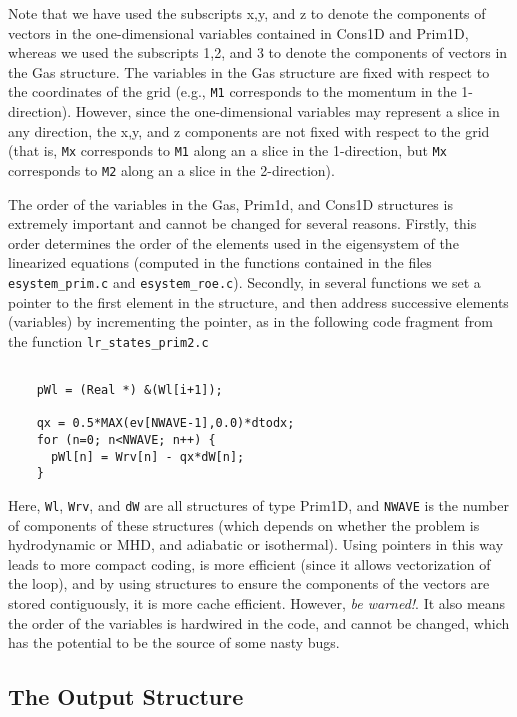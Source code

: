 Note that we have used the subscripts x,y, and z to denote the components
of vectors in the one-dimensional variables contained in Cons1D and
Prim1D, whereas we used the subscripts 1,2, and 3 to denote the components
of vectors in the Gas structure.  The variables in the Gas structure
are fixed with respect to the coordinates of the grid (e.g., {\tt M1}
corresponds to the momentum in the 1-direction).  However, since the
one-dimensional variables may represent a slice in any direction, the
x,y, and z components are not fixed with respect to the grid (that is,
{\tt Mx} corresponds to {\tt M1} along an a slice in the 1-direction,
but {\tt Mx} corresponds to {\tt M2} along an a slice in the 2-direction).

The order of the variables in the Gas, Prim1d, and Cons1D structures is
extremely important and
cannot be changed for several reasons.  Firstly, this order determines the
order of the elements used in the eigensystem of the linearized equations
(computed in the functions contained in the files {\tt esystem\_prim.c}
and {\tt esystem\_roe.c}).  Secondly, in several functions we set a
pointer to the first element in the structure, and then address successive
elements (variables) by incrementing the pointer, as in the
following code fragment from the function {\tt lr\_states\_prim2.c}

\footnotesize
\begin{verbatim}

    pWl = (Real *) &(Wl[i+1]);

    qx = 0.5*MAX(ev[NWAVE-1],0.0)*dtodx;
    for (n=0; n<NWAVE; n++) {
      pWl[n] = Wrv[n] - qx*dW[n];
    }

\end{verbatim}
\normalsize
Here, {\tt Wl}, {\tt Wrv}, and {\tt dW} are all structures of type Prim1D,
and {\tt NWAVE} is the number of components of these structures (which
depends on whether the problem is hydrodynamic or MHD, and adiabatic or
isothermal).  Using pointers in this way leads to more compact coding,
is more efficient (since it allows vectorization of the loop), and by
using structures to ensure the components of the vectors are stored
contiguously, it is more cache efficient.  However, {\em be warned!}.
It also means the order of the variables is hardwired in the code,
and cannot be changed, which has the potential to be the source of some
nasty bugs.

\subsection{The Output Structure}

